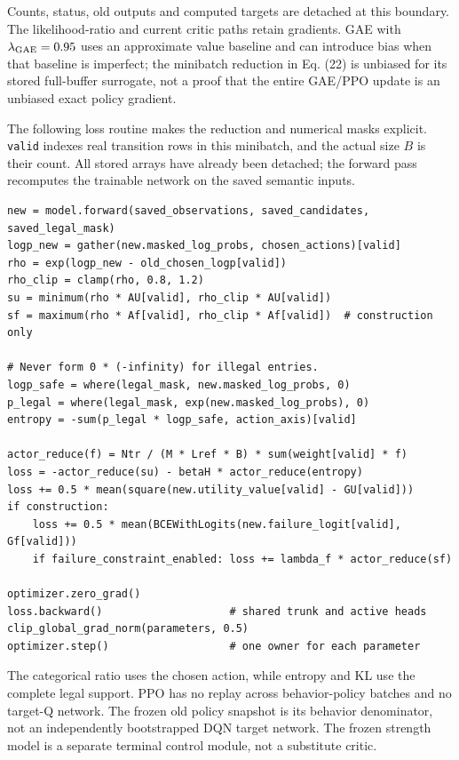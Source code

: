 \documentclass[10pt,a4paper]{article}
\begin{document}
Counts, status, old outputs and computed targets are detached at this
boundary. The likelihood-ratio and current critic paths retain
gradients. GAE with \(\lambda_{\rm GAE}=0.95\) uses an approximate value
baseline and can introduce bias when that baseline is imperfect; the
minibatch reduction in Eq. (22) is unbiased for its stored full-buffer
surrogate, not a proof that the entire GAE/PPO update is an unbiased
exact policy gradient.

The following loss routine makes the reduction and numerical masks
explicit. \texttt{valid} indexes real transition rows in this minibatch,
and the actual size \(B\) is their count. All stored arrays have already
been detached; the forward pass recomputes the trainable network on the
saved semantic inputs.

\begin{verbatim}
new = model.forward(saved_observations, saved_candidates, saved_legal_mask)
logp_new = gather(new.masked_log_probs, chosen_actions)[valid]
rho = exp(logp_new - old_chosen_logp[valid])
rho_clip = clamp(rho, 0.8, 1.2)
su = minimum(rho * AU[valid], rho_clip * AU[valid])
sf = maximum(rho * Af[valid], rho_clip * Af[valid])  # construction only

# Never form 0 * (-infinity) for illegal entries.
logp_safe = where(legal_mask, new.masked_log_probs, 0)
p_legal = where(legal_mask, exp(new.masked_log_probs), 0)
entropy = -sum(p_legal * logp_safe, action_axis)[valid]

actor_reduce(f) = Ntr / (M * Lref * B) * sum(weight[valid] * f)
loss = -actor_reduce(su) - betaH * actor_reduce(entropy)
loss += 0.5 * mean(square(new.utility_value[valid] - GU[valid]))
if construction:
    loss += 0.5 * mean(BCEWithLogits(new.failure_logit[valid], Gf[valid]))
    if failure_constraint_enabled: loss += lambda_f * actor_reduce(sf)

optimizer.zero_grad()
loss.backward()                    # shared trunk and active heads
clip_global_grad_norm(parameters, 0.5)
optimizer.step()                   # one owner for each parameter
\end{verbatim}

The categorical ratio uses the chosen action, while entropy and KL use
the complete legal support. PPO has no replay across behavior-policy
batches and no target-Q network. The frozen old policy snapshot is its
behavior denominator, not an independently bootstrapped DQN target
network. The frozen strength model is a separate terminal control
module, not a substitute critic.
\end{document}
